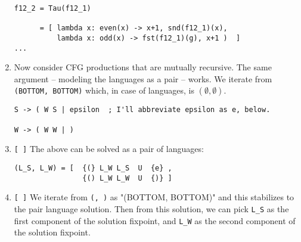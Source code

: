 \documentclass[11pt]{article}
\begin{document}
\begin{Large}
\begin{enumerate}
\begin{footnotesize}
\begin{verbatim}
f12_2 = Tau(f12_1)

      = [ lambda x: even(x) -> x+1, snd(f12_1)(x),
          lambda x: odd(x) -> fst(f12_1)(g), x+1 )  ]
...
  \end{verbatim}
  \end{footnotesize}

\item Now consider CFG productions that are mutually recursive.
  The same argument -- modeling the languages as a pair -- works.
%
We iterate from {\tt (BOTTOM, BOTTOM)} which, in case of languages,
is $(\emptyset, \emptyset)$.

\begin{verbatim}
S -> ( W S | epsilon  ; I'll abbreviate epsilon as e, below.

W -> ( W W | )
\end{verbatim}

\item \verb|[ ]| The above can be solved as a pair of languages:

\begin{verbatim}
(L_S, L_W) = [  {(} L_W L_S  U  {e} ,
                {() L_W L_W  U  {)} ]
  \end{verbatim}

\item \verb|[ ]| We iterate from {\tt ({}, {})} as "(BOTTOM, BOTTOM)"
and this stabilizes to the pair language solution. Then from this
solution, we can pick \verb|L_S| as the first component
of  the solution fixpoint,
and
\verb|L_W| as the second component of the solution fixpoint.
  
\end{enumerate}

\end{Large}
\end{document}
